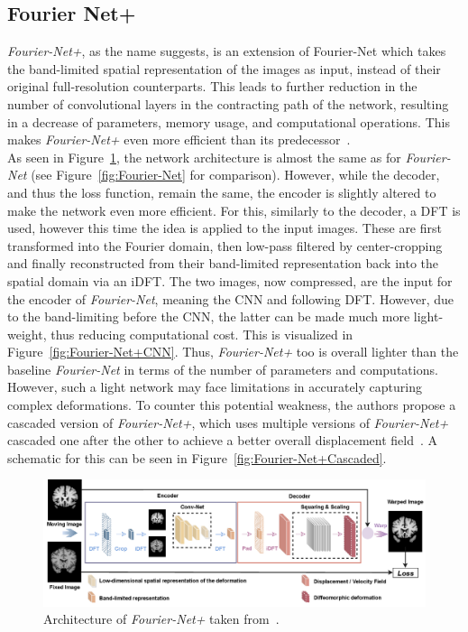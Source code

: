 \subsection{Fourier Net+} \label{SubSec:Fourier-Net+}
\emph{Fourier-Net+}, as the name suggests, is an extension of Fourier-Net which takes the band-limited spatial representation of the images as input, instead of their original full-resolution counterparts. This leads to further reduction in the number of convolutional layers in the contracting path of the network, resulting in a decrease of parameters, memory usage, and computational operations. This makes \emph{Fourier-Net+} even more efficient than its predecessor~\cite{Fourier-Net+}.\\
As seen in Figure~\ref{fig:Fourier-Net+}, the network architecture is almost the same as for \emph{Fourier-Net} (see Figure~\ref{fig:Fourier-Net} for comparison). However, while the decoder, and thus the loss function, remain the same, the encoder is slightly altered to make the network even more efficient. For this, similarly to the decoder, a DFT is used, however this time the idea is applied to the input images. These are first transformed into the Fourier domain, then low-pass filtered by center-cropping and finally reconstructed from their band-limited representation back into the spatial domain via an iDFT. The two images, now compressed, are the input for the encoder of \emph{Fourier-Net}, meaning the CNN and following DFT. However, due to the band-limiting before the CNN, the latter can be made much more light-weight, thus reducing computational cost. This is visualized in Figure~\ref{fig:Fourier-Net+CNN}. Thus, \emph{Fourier-Net+} too is overall lighter than the baseline \emph{Fourier-Net} in terms of the number of parameters and computations. However, such a light network may face limitations in accurately capturing complex deformations. To counter this potential weakness, the authors propose a cascaded version of \emph{Fourier-Net+}, which uses multiple versions of \emph{Fourier-Net+} cascaded one after the other to achieve a better overall displacement field~\cite{Fourier-Net+}. A schematic for this can be seen in Figure~\ref{fig:Fourier-Net+Cascaded}.

\begin{figure}[h] %
	\centering
	\graphicspath{{images/}{\main/images/}}
	\includegraphics[width=\linewidth]{ArchitectureFourier-Net+.png} 
	\caption{Architecture of \emph{Fourier-Net+} taken from~\cite{Fourier-Net+}.}
	\label{fig:Fourier-Net+}
\end{figure}

